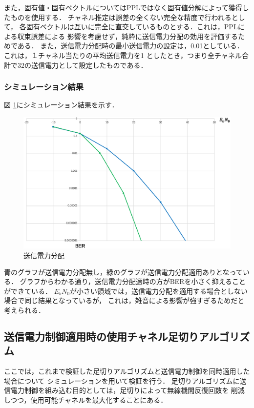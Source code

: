 また，固有値・固有ベクトルについてはPPLではなく固有値分解によって獲得したものを使用する．
チャネル推定は誤差の全くない完全な精度で行われるとして，
各固有ベクトルは互いに完全に直交しているものとする．これは，PPLによる収束誤差による
影響を考慮せず，純粋に送信電力分配の効用を評価するためである．
また，送信電力分配時の最小送信電力の設定は，0.01としている．これは，１チャネル当たりの平均送信電力を1
としたとき，つまり全チャネル合計で32の送信電力として設定したものである．

\subsubsection{シミュレーション結果}
図 \ref{figPconSim1}にシミュレーション結果を示す．

\begin{figure}[ht]
    \centering
    \includegraphics[width=0.95\linewidth]{chapter4/figure/PconSim1.eps}
    \caption{送信電力分配}
    \label{figPconSim1}
\end{figure}

青のグラフが送信電力分配無し，緑のグラフが送信電力分配適用ありとなっている．
グラフからわかる通り，送信電力分配適時の方がBERを小さく抑えることができている．
$E_bN_0$が小さい領域では，送信電力分配を適用する場合としない場合で同じ結果となっているが，
これは，雑音による影響が強すぎるためだと考えられる．

\subsection{送信電力制御適用時の使用チャネル足切りアルゴリズム}
ここでは，これまで検証した足切りアルゴリズムと送信電力制御を同時適用した場合について
シミュレーションを用いて検証を行う．
足切りアルゴリズムに送信電力制御を組み込む目的としては，足切りによって無線機間反復回数を
削減しつつ，使用可能チャネルを最大化することにある．

